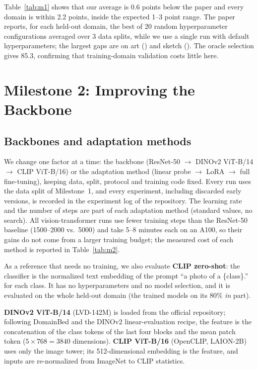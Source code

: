 \documentclass[conference]{IEEEtran}
\begin{document}
Table~\ref{tab:m1} shows that our average is 0.6 points below the paper and every domain is within 2.2 points, inside the expected 1--3 point range. The paper reports, for each held-out domain, the best of 20 random hyperparameter configurations averaged over 3 data splits, while we use a single run with default hyperparameters; the largest gaps are on art () and sketch (). The oracle selection gives 85.3, confirming that training-domain validation costs little here.

\section{Milestone 2: Improving the Backbone}\label{sec:m2}
\subsection{Backbones and adaptation methods}
We change one factor at a time: the backbone (ResNet-50 $\to$ DINOv2 ViT-B/14 $\to$ CLIP ViT-B/16) or the adaptation method (linear probe $\to$ LoRA $\to$ full fine-tuning), keeping data, split, protocol and training code fixed. Every run uses the data split of Milestone~1, and every experiment, including discarded early versions, is recorded in the experiment log of the repository. The learning rate and the number of steps are part of each adaptation method (standard values, no search). All vision-transformer runs use fewer training steps than the ResNet-50 baseline (1500--2000 vs.\ 5000) and take 5--8 minutes each on an A100, so their gains do not come from a larger training budget; the measured cost of each method is reported in Table~\ref{tab:m2}.

As a reference that needs no training, we also evaluate \textbf{CLIP zero-shot}: the classifier is the normalized text embedding of the prompt ``a photo of a \{class\}.'' for each class. It has no hyperparameters and no model selection, and it is evaluated on the whole held-out domain (the trained models on its 80\% \emph{in} part).

\textbf{DINOv2 ViT-B/14} (LVD-142M) is loaded from the official repository; following DomainBed and the DINOv2 linear-evaluation recipe, the feature is the concatenation of the class tokens of the last four blocks and the mean patch token ($5\times768=3840$ dimensions). \textbf{CLIP ViT-B/16} (OpenCLIP, LAION-2B) uses only the image tower; its 512-dimensional embedding is the feature, and inputs are re-normalized from ImageNet to CLIP statistics.
\end{document}
